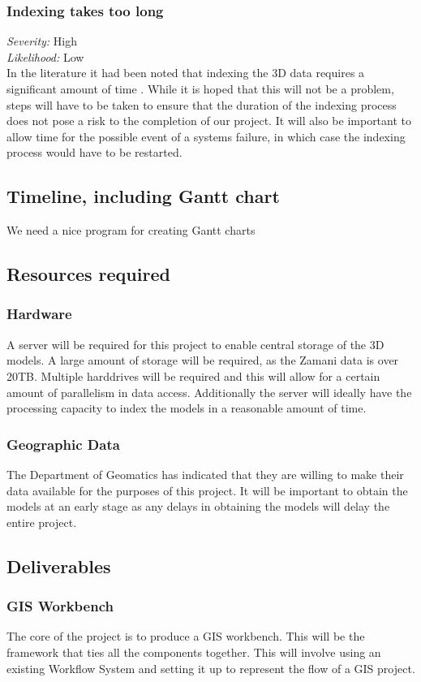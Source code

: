 \documentclass[12pt,a4paper]{article}
\begin{document}
\subsubsection*{Indexing takes too long}
\noindent \textit{Severity: } High \\
\noindent \textit{Likelihood: } Low \\
In the literature it had been noted that indexing the 3D data requires a significant
amount of time \cite{interactivepointclouds}. While it is hoped that this will not be
a problem, steps will have to be taken to ensure that the duration of the indexing
process does not pose a risk to the completion of our project. It will also be important
to allow time for the possible event of a systems failure, in which case the indexing
process would have to be restarted.
\subsection{Timeline, including Gantt chart}
We need a nice program for creating Gantt charts
\subsection{Resources required}
\subsubsection*{Hardware}
A server will be required for this project to enable central storage of the 3D models.
A large amount of storage will be required, as the Zamani data is over 20TB. Multiple
harddrives will be required and this will allow for a certain amount of parallelism in
data access. Additionally the server will ideally have the processing capacity to index
the models in a reasonable amount of time.
\subsubsection*{Geographic Data}
The Department of Geomatics has indicated that they are willing to make their data
available for the purposes of this project. It will be important to obtain the
models at an early stage as any delays in obtaining the models will delay the entire project.
\subsection{Deliverables}
\subsubsection*{GIS Workbench}
The core of the project is to produce a GIS workbench. This will
be the framework that ties all the components together. This will involve
using an existing Workflow System and setting it up to represent the
flow of a GIS project.
\end{document}
